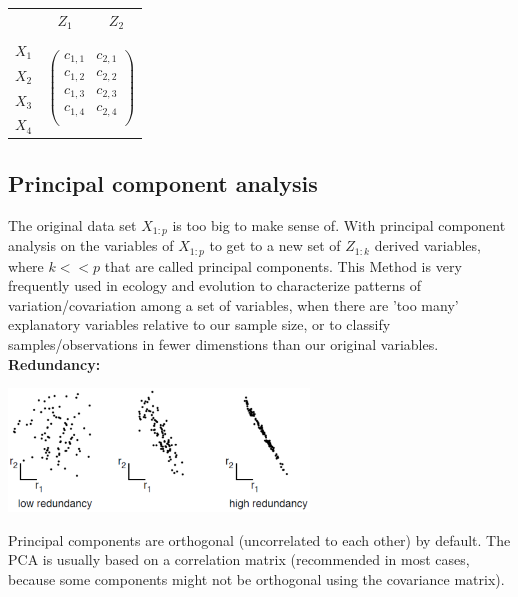 \documentclass{article}
\begin{document}
\begin{table}[h]
    \centering
    \begin{tabular}{c c c}
         & $Z_1$ & $Z_2$ \\
         & & \\
         $X_1$ & \multicolumn{2}{c}{\multirow{4}{*}{$\begin{pmatrix}
                                                    c_{1,1} & c_{2,1}\\
                                                    c_{1,2} & c_{2,2}\\
                                                    c_{1,3} & c_{2,3}\\
                                                    c_{1,4} & c_{2,4}\\
                                                    \end{pmatrix}$}}\\
         $X_2$ & \multicolumn{2}{c}{}\\
         $X_3$ & \multicolumn{2}{c}{}\\
         $X_4$ & \multicolumn{2}{c}{}\\
    \end{tabular}
\end{table}
\subsection{Principal component analysis}
The original data set $X_{1:p}$ is too big to make sense of. With principal component analysis on the variables of $X_{1:p}$ to get to a new set of $Z_{1:k}$ derived variables, where $k << p$ that are called principal components. This Method is very frequently used in ecology and evolution to characterize patterns of variation/covariation among a set of variables, when there are 'too many' explanatory variables relative to our sample size, or to classify samples/observations in fewer dimenstions than our original variables.\\
\textbf{Redundancy:}
\begin{center}
    \includegraphics[width = 0.6\textwidth]{PCA/pca_redundancy.png}
\end{center}
Principal components are orthogonal (uncorrelated to each other) by default. The PCA is usually based on a correlation matrix (recommended in most cases, because some components might not be orthogonal using the covariance matrix).
\end{document}
